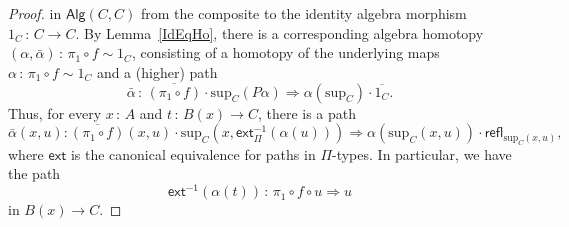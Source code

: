 \documentclass[10pt,a4paper,oneside,reqno]{amsart}
\numberwithin{equation}{section}
\theoremstyle{mythm}
\theoremstyle{mydef}
\theoremstyle{myrmk}
\newcommand{\co}{\,{:}\,}
\newcommand{\com}{\circ}
\newcommand{\ct}{\cdot}
\newcommand{\ext}{\mathsf{ext}}
\newcommand{\refl}{\mathsf{refl}}
\newcommand{\Palg}{\mathsf{Alg}}
\renewcommand{\sup}{\mathrm{sup}}
\begin{document}
\begin{proof}
in $\Palg(C,C)$ from the composite to the identity algebra morphism $1_C \co C \to C$.
%
By Lemma~\ref{IdEqHo}, there is a corresponding algebra homotopy $(\alpha,\bar{\alpha}) \co \pi_1 \circ f \sim 1_C$,  consisting of a homotopy of the underlying maps $\alpha \co \pi_1 \circ f \sim 1_C$ and a (higher) path
\begin{equation*}
\bar{\alpha} \co \overline{(\pi_1 \com f)} \cdot \sup_C (P \alpha) \Rightarrow \alpha(\sup_C) \cdot \overline{1_C}.
\end{equation*}
Thus, for every $x \co A$ and $t\co B(x)\to C$, there is a path
\begin{equation}\label{equ:alphabar}
\bar{\alpha}(x,u) :   \overline{(\pi_1 \com f)}(x,u) \ct \sup_C(x,\ext_\Pi^{-1}(\alpha(u))) \Rightarrow \alpha(\sup_C(x,u)) \cdot \refl_{\sup_C(x,u)},
\end{equation}
where $\ext$ is the canonical equivalence for paths in $\Pi$-types. 
In particular, we have the path 
\[
\ext^{-1}(\alpha(t))\co\pi_1 \circ f \circ u \Rightarrow u
\]
in $B(x) \to C$.


\end{proof}
\end{document}
